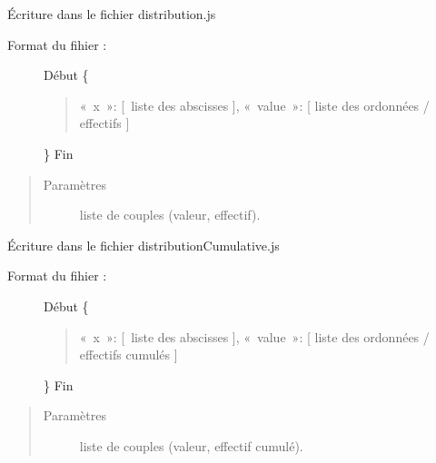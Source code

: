 \documentclass[letterpaper,10pt,french]{sphinxmanual}
\begin{document}
\begin{fulllineitems}
\label{\detokenize{addQuantitativesDiscretes:add.addQuantitativesDiscretes.infoDistributionDiscrete}}
Écriture dans le fichier distribution.js
\begin{description}
\item[{Format du fihier :}] \leavevmode
Début
\{
\begin{quote}

« x »: {[} liste des abscisses {]},
« value »: {[} liste des ordonnées / effectifs {]}
\end{quote}

\}
Fin

\end{description}
\begin{quote}\begin{description}
\item[{Paramètres}] \leavevmode
{} \textendash{} liste de couples (valeur, effectif).

\end{description}\end{quote}

\end{fulllineitems}


\begin{fulllineitems}
\label{\detokenize{addQuantitativesDiscretes:add.addQuantitativesDiscretes.infoDistributionCumulativeDiscrete}}
Écriture dans le fichier distributionCumulative.js
\begin{description}
\item[{Format du fihier :}] \leavevmode
Début
\{
\begin{quote}

« x »: {[} liste des abscisses {]},
« value »: {[} liste des ordonnées / effectifs cumulés {]}
\end{quote}

\}
Fin

\end{description}
\begin{quote}\begin{description}
\item[{Paramètres}] \leavevmode
{} \textendash{} liste de couples (valeur, effectif cumulé).

\end{description}\end{quote}

\end{fulllineitems}
\end{document}
